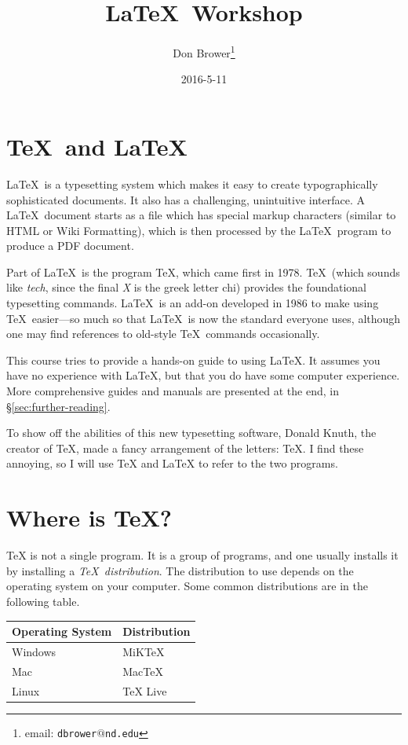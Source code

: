 \documentclass{article}
\begin{document}
\title{\LaTeX\ Workshop}
\author{Don Brower\thanks{email: \texttt{dbrower$@$nd.edu}}}
\date{2016-5-11}
\maketitle

\section{\TeX\ and \LaTeX}

\LaTeX\ is a typesetting system which makes it easy to create typographically sophisticated documents.
It also has a challenging, unintuitive interface.
A \LaTeX\ document starts as a file which has special markup characters (similar to HTML or Wiki Formatting),
which is then processed by the \LaTeX\ program to produce a PDF document.

Part of \LaTeX\ is the program \TeX, which came first in 1978.
\TeX\ (which sounds like \textit{tech}, since the final \textit{X} is the greek letter chi) provides the foundational typesetting commands.
\LaTeX\ is an add-on developed in 1986 to make using \TeX\ easier---so much so that \LaTeX\ 
is now the standard everyone uses, although one may find references to old-style \TeX\ commands occasionally.

This course tries to provide a hands-on guide to using \LaTeX.
It assumes you have no experience with \LaTeX, but that you do have some computer experience.
More comprehensive guides and manuals are presented at the end, in \S\ref{sec:further-reading}.

To show off the abilities of this new typesetting software, Donald Knuth, the creator of \TeX, made
a fancy arrangement of the letters: \TeX.
I find these annoying, so I will use TeX and LaTeX to refer to the two programs.

\section{Where is \TeX?}

TeX is not a single program.
It is a group of programs, and one usually installs it by installing a \textit{\TeX\ distribution}.
The distribution to use depends on the operating system on your computer.
Some common distributions are in the following table.

\begin{center}
\begin{tabular}{ll}
    \toprule
    Operating System & Distribution \\
    \midrule
    Windows & MiKTeX \\
    Mac & MacTeX \\
    Linux & TeX Live \\
    \bottomrule
\end{tabular}
\end{center}
\end{document}
